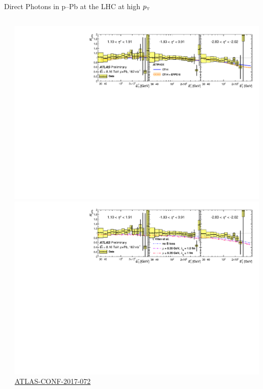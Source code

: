 \documentclass[aspectratio=169,10pt]{beamer}
\newcommand{\pT}          {\ensuremath{p_{\mbox{\tiny T}}}}
\begin{document}
\begin{frame}{Direct Photons in p--Pb at the LHC at high \pT}
\begin{columns}
\begin{column}{5.4cm}
        \end{column}
        \begin{column}{10cm}
          \includegraphics[width=\textwidth]{EMLectureWeek2018/ATLAS_pPb8TeV_fig_03a.pdf} \\
          \includegraphics[width=\textwidth]{EMLectureWeek2018/ATLAS_pPb8TeV_fig_03c.pdf}\\
          \hspace{7.9cm} \tiny \href{https://cds.cern.ch/record/2285810/files/ATLAS-CONF-2017-072.pdf}{ATLAS-CONF-2017-072}
        \end{column}
    \end{columns}
    \end{frame}
    
\end{document}
